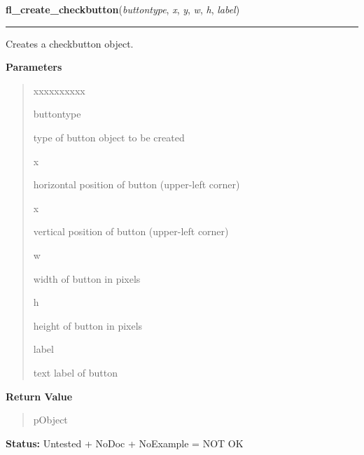     \label{xformslib:library:fl_create_checkbutton}

    \vspace{0.5ex}

\hspace{.8\funcindent}\begin{boxedminipage}{\funcwidth}

    \raggedright \textbf{fl\_create\_checkbutton}(\textit{buttontype}, \textit{x}, \textit{y}, \textit{w}, \textit{h}, \textit{label})

    \vspace{-1.5ex}

    \rule{\textwidth}{0.5\fboxrule}
\setlength{\parskip}{2ex}
    Creates a checkbutton object.

\setlength{\parskip}{1ex}
      \textbf{Parameters}
      \vspace{-1ex}

      \begin{quote}
        \begin{Ventry}{xxxxxxxxxx}

          \item[buttontype]

          type of button object to be created

          \item[x]

          horizontal position of button (upper-left corner)

          \item[x]

          vertical position of button (upper-left corner)

          \item[w]

          width of button in pixels

          \item[h]

          height of button in pixels

          \item[label]

          text label of button

        \end{Ventry}

      \end{quote}

      \textbf{Return Value}
    \vspace{-1ex}

      \begin{quote}
      pObject

      \end{quote}

\textbf{Status:} Untested + NoDoc + NoExample = NOT OK



    \end{boxedminipage}

